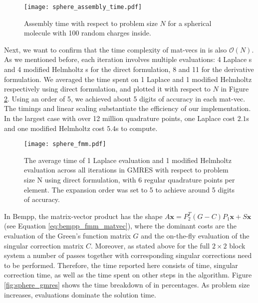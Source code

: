 \begin{figure}%
    \centering
    \texttt{[image: sphere\_assembly\_time.pdf]} 
    \caption{Assembly time with respect to problem size $N$ for a spherical molecule with 100 random charges inside.}
    \label{fig:sphere_assembly_time}
\end{figure}

Next, we want to confirm that the time complexity of mat-vecs in \gmres is also $\mathcal{O}(N)$.
As we mentioned before, each iteration involves multiple \fmm evaluations: 4 Laplace {\fmm}s and 4 modified Helmholtz {\fmm}s for the direct formulation, 8 and 11 for the derivative formulation.
We averaged the time spent on 1 Laplace \fmm and 1 modified Helmholtz \fmm respectively using direct formulation, and plotted it with respect to $N$ in Figure \ref{fig:sphere_fmm}.
Using an \fmm order of 5, we achieved about 5 digits of accuracy in each mat-vec.
The timings and linear scaling substantiate the efficiency of our \fmm implementation.
In the largest case with over 12 million quadrature points, one Laplace \fmm cost $2.1$s and one modified Helmholtz \fmm cost $5.4$s to compute.

\begin{figure}%
    \centering
    \texttt{[image: sphere\_fmm.pdf]} 
    \caption{The average time of 1 Laplace \fmm evaluation and 1 modified Helmholtz evaluation across all iterations in GMRES with respect to problem size N using direct formulation, with 6 regular quadrature points per element.
    The \fmm expansion order was set to 5 to achieve around 5 digits of accuracy.
    }
    \label{fig:sphere_fmm}
\end{figure}

In Bempp, the matrix-vector product has the shape $A\mathbf{x} = P_2^T (G - C)P_1 \mathbf{x} + S \mathbf{x}$ (see Equation \ref{eq:bempp_fmm_matvec}), where the dominant costs are the \fmm evaluation of the Green's function matrix $G$ and the on-the-fly evaluation of the singular correction matrix $C$. Moreover, as stated above for the full $2\times 2$ block system a number of \fmm passes together with corresponding singular corrections need to be performed.
Therefore, the \gmres time reported here consists of \fmm time, singular correction time, as well as the time spent on other steps in the \gmres algorithm.
Figure \ref{fig:sphere_gmres} shows the time breakdown of \gmres in percentages.
As problem size increases, \fmm evaluations dominate the solution time.

